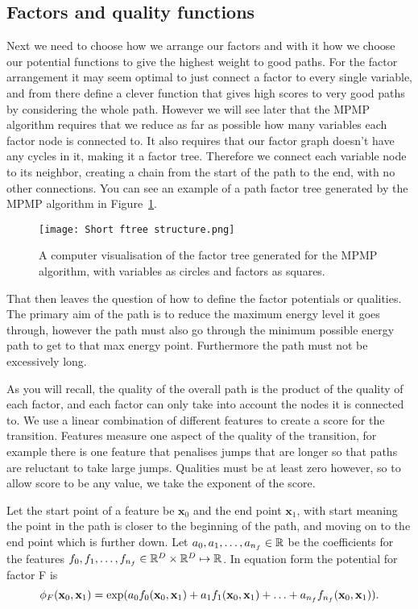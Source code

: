 \FloatBarrier
\subsection{Factors and quality functions}
\label{subsec:fac_qual}
Next we need to choose how we arrange our factors and with it how we choose our potential functions to give the highest weight to good paths.
For the factor arrangement it may seem optimal to just connect a factor to every single variable, and from there define a clever function that gives high scores to very good paths by considering the whole path.
However we will see later that the MPMP algorithm requires that we reduce as far as possible how many variables each factor node is connected to.
It also requires that our factor graph doesn't have any cycles in it, making it a factor tree.
Therefore we connect each variable node to its neighbor, creating a chain from the start of the path to the end, with no other connections.
You can see an example of a path factor tree generated by the MPMP algorithm in Figure~\ref{fig:path_ftree}.

\begin{figure}[h]
    \centering
    \texttt{[image: Short ftree structure.png]}
    \caption{A computer visualisation of the factor tree generated for the MPMP algorithm, with variables as circles and factors as squares.}
    \label{fig:path_ftree}
\end{figure}

That then leaves the question of how to define the factor potentials or qualities.
The primary aim of the path is to reduce the maximum energy level it goes through, however the path must also go through the minimum possible energy path to get to that max energy point.
Furthermore the path must not be excessively long.

As you will recall, the quality of the overall path is the product of the quality of each factor, and each factor can only take into account the nodes it is connected to.
We use a linear combination of different features to create a score for the transition.
Features measure one aspect of the quality of the transition, for example there is one feature that penalises jumps that are longer so that paths are reluctant to take large jumps.
Qualities must be at least zero however, so to allow score to be any value, we take the exponent of the score.

Let the start point of a feature be $\mathbf{x}_0$ and the end point $\mathbf{x}_1$, with start meaning the point in the path is closer to the beginning of the path, and moving on to the end point which is further down.
Let $a_0, a_1, \mathellipsis, a_{n_f} \in \mathbb{R}$ be the coefficients for the features $f_0, f_1, \mathellipsis, f_{n_f} \in \mathbb{R}^D \times \mathbb{R}^D \mapsto \mathbb{R}$.
In equation form the potential for factor F is
\begin{equation}
    \label{eq:factor_qual}
    \phi_F(\mathbf{x}_0, \mathbf{x}_1) = \exp(a_0 f_0(\mathbf{x}_0, \mathbf{x}_1) + a_1 f_1(\mathbf{x}_0, \mathbf{x}_1) + \mathellipsis + a_{n_f} f_{n_f} (\mathbf{x}_0, \mathbf{x}_1)).
\end{equation}

